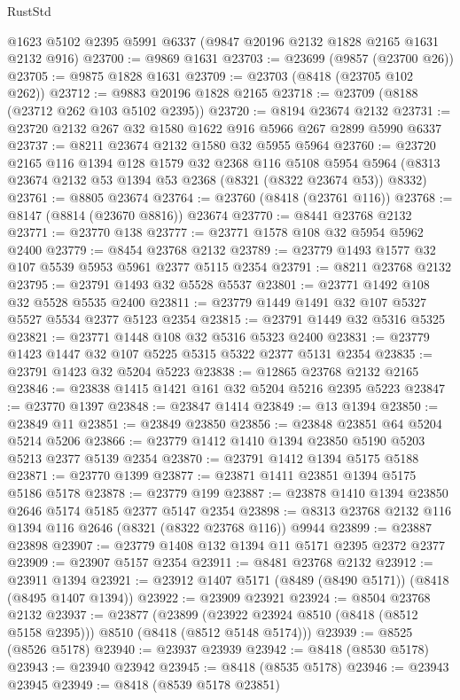 \begin{lexlean}{RustStd}
\begin{coremodule}
    @1623
    @5102
    @2395
    @5991
    @6337
    (@9847 @20196 @2132 @1828 @2165 @1631 @2132 @916)
@23700 := @9869 @1631
@23703 := @23699 (@9857 (@23700 @26))
@23705 := @9875 @1828 @1631
@23709 := @23703 (@8418 (@23705 @102 @262))
@23712 := @9883 @20196 @1828 @2165
@23718 := @23709 (@8188 (@23712 @262 @103 @5102 @2395))
@23720 := @8194 @23674 @2132
@23731 := @23720 @2132 @267 @32 @1580 @1622 @916 @5966 @267 @2899 @5990 @6337
@23737 := @8211 @23674 @2132 @1580 @32 @5955 @5964
@23760 := @23720
    @2165
    @116
    @1394
    @128
    @1579
    @32
    @2368
    @116
    @5108
    @5954
    @5964
    (@8313 @23674 @2132 @53 @1394 @53 @2368 (@8321 (@8322 @23674 @53)) @8332)
@23761 := @8805 @23674
@23764 := @23760 (@8418 (@23761 @116))
@23768 := @8147 (@8814 (@23670 @8816)) @23674
@23770 := @8441 @23768 @2132
@23771 := @23770 @138
@23777 := @23771 @1578 @108 @32 @5954 @5962 @2400
@23779 := @8454 @23768 @2132
@23789 := @23779 @1493 @1577 @32 @107 @5539 @5953 @5961 @2377 @5115 @2354
@23791 := @8211 @23768 @2132
@23795 := @23791 @1493 @32 @5528 @5537
@23801 := @23771 @1492 @108 @32 @5528 @5535 @2400
@23811 := @23779 @1449 @1491 @32 @107 @5327 @5527 @5534 @2377 @5123 @2354
@23815 := @23791 @1449 @32 @5316 @5325
@23821 := @23771 @1448 @108 @32 @5316 @5323 @2400
@23831 := @23779 @1423 @1447 @32 @107 @5225 @5315 @5322 @2377 @5131 @2354
@23835 := @23791 @1423 @32 @5204 @5223
@23838 := @12865 @23768 @2132 @2165
@23846 := @23838 @1415 @1421 @161 @32 @5204 @5216 @2395 @5223
@23847 := @23770 @1397
@23848 := @23847 @1414
@23849 := @13 @1394
@23850 := @23849 @11
@23851 := @23849 @23850
@23856 := @23848 @23851 @64 @5204 @5214 @5206
@23866 := @23779 @1412 @1410 @1394 @23850 @5190 @5203 @5213 @2377 @5139 @2354
@23870 := @23791 @1412 @1394 @5175 @5188
@23871 := @23770 @1399
@23877 := @23871 @1411 @23851 @1394 @5175 @5186 @5178
@23878 := @23779 @199
@23887 := @23878 @1410 @1394 @23850 @2646 @5174 @5185 @2377 @5147 @2354
@23898 := @8313 @23768 @2132 @116 @1394 @116 @2646 (@8321 (@8322 @23768 @116)) @9944
@23899 := @23887 @23898
@23907 := @23779 @1408 @132 @1394 @11 @5171 @2395 @2372 @2377
@23909 := @23907 @5157 @2354
@23911 := @8481 @23768 @2132
@23912 := @23911 @1394
@23921 := @23912 @1407 @5171 (@8489 (@8490 @5171)) (@8418 (@8495 @1407 @1394))
@23922 := @23909 @23921
@23924 := @8504 @23768 @2132
@23937 := @23877
    (@23899 (@23922 @23924 @8510 (@8418 (@8512 @5158 @2395))) @8510 (@8418 (@8512 @5148 @5174)))
@23939 := @8525 (@8526 @5178)
@23940 := @23937 @23939
@23942 := @8418 (@8530 @5178)
@23943 := @23940 @23942
@23945 := @8418 (@8535 @5178)
@23946 := @23943 @23945
@23949 := @8418 (@8539 @5178 @23851)

\end{coremodule}
\end{lexlean}
